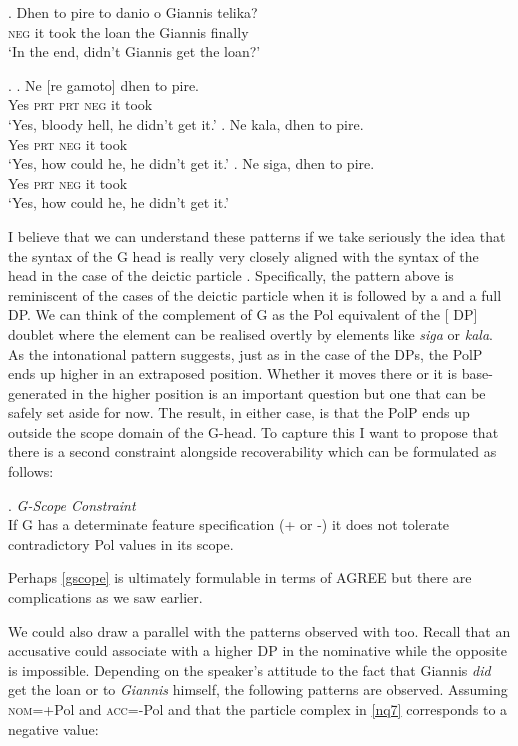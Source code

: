 \documentclass[output=paper]{LSP/langsci}
\begin{document}
\exg. 
Dhen to pire to danio o Giannis telika?\\
\textsc{neg} it took the loan the Giannis finally\\  \label{nq3a}
\glt `In the end, didn't Giannis get the loan?'

\Lsciex.
\ag. 
Ne [re gamoto]  dhen to pire.\\
Yes \textsc{prt} \textsc{prt} \textsc{neg} it took\\ \label{nq4a}
\glt `Yes, bloody hell, he didn't get it.'
\bg. 
Ne kala,  dhen to pire.\\
Yes \textsc{prt} \textsc{neg} it took\\ \label{nq5}
\glt `Yes, how could he, he didn't get it.'
\cg. 
Ne siga,  dhen to pire.\\
Yes \textsc{prt} \textsc{neg} it took\\ \label{nq6}
\glt `Yes, how could he, he didn't get it.'


I believe that we can understand these patterns if we take seriously the idea that the syntax of the G head is really very closely aligned with the syntax of the \xspace\Pointinghand head in the case of the deictic particle \na.  Specifically, the pattern above is reminiscent of the cases of the deictic particle when it is followed by a  and a full DP.  We can think of the complement of G as the Pol equivalent of the [ DP] doublet where the  element can be realised overtly by elements like \textit{siga} or \textit{kala}.  As the intonational pattern suggests, just as in the case of the DPs, the PolP ends up higher in an extraposed position.  Whether it moves there or it is base-generated in the higher position is an important {question} but one that can be safely set aside for now.  The result, in either case,  is that the PolP ends up outside the scope domain of the G-head.  To capture this I want to propose that there is a second constraint alongside recoverability which can be formulated as follows:

\Lsciex. 
\textit{G-Scope Constraint}\\ \label{gscope}
If G has a determinate feature specification (+ or -) it does not tolerate contradictory Pol values in its scope.

Perhaps \ref{gscope} is ultimately formulable in terms of AGREE but there are complications as we saw earlier. 

We could also draw a parallel with the   patterns observed with \na too.  Recall that an accusative  could associate with a higher DP in the nominative while the opposite is impossible.   Depending on the speaker's attitude to the fact that Giannis \textit{did} get the loan or to \textit{Giannis} himself, the following patterns are observed. Assuming \textsc{nom}=+Pol and \textsc{acc}=-Pol and that the particle complex in \ref{nq7} corresponds to a negative value:
\end{document}
